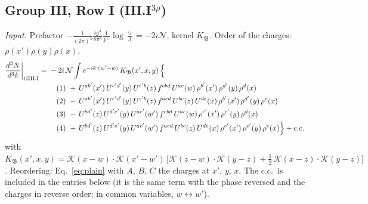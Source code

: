 \documentclass[10pt]{article}
\numberwithin{equation}{section}
\newcommand{\KK}{\mathcal K}
\newcommand{\NN}{\mathcal N}
\begin{document}
\subsection{Group III, Row I \texorpdfstring{(III.I$^{3\rho}$)}{}}\label{src:3:III.I}
\emph{Input.} Prefactor $-\frac{1}{(2\pi)^3}\frac{ig^4}{8\pi^5}\frac1{k^+}\log\frac\vee\Lambda=-2i\NN$, kernel $K_{\mathfrak B}$. Order of the charges: $\rho(x')\rho(y)\rho(x)$.
\begin{align}
\frac{d^3N}{d^3k}\bigg|_{\rm GIII.I}={}&-2i\,\NN\int e^{-ik\cdot(w'-w)}\,K_{\mathfrak B}(x',x,y)\,\Big\{\notag\\
&\quad (1)\ +\,U^{ab'}(x')\,U^{c'd'}(y)\,U^{c'b}(z)\,f^{cbd}\,U^{ac}(w)\,\rho^{b'}(x')\,\rho^{d'}(y)\,\rho^{d}(x)\notag\\
&\quad (2)\ -\,U^{ab'}(x')\,U^{c'd'}(y)\,U^{c'b}(z)\,f^{acd}\,U^{bc}(z)\,U^{de}(x)\,\rho^{b'}(x')\,\rho^{d'}(y)\,\rho^{e}(x)\notag\\
&\quad (3)\ -\,U^{bd'}(z)\,U^{d'e'}(y)\,U^{ac'}(w')\,f^{cbd}\,U^{ac}(w)\,\rho^{c'}(x')\,\rho^{e'}(y)\,\rho^{d}(x)\notag\\
&\quad (4)\ +\,U^{bd'}(z)\,U^{d'e'}(y)\,U^{ac'}(w')\,f^{acd}\,U^{bc}(z)\,U^{de}(x)\,\rho^{c'}(x')\,\rho^{e'}(y)\,\rho^{e}(x)\Big\}+{\rm c.c.}\label{eq:in-GIII.I}
\end{align}
with $K_{\mathfrak B}(x',x,y)=\KK(x-w)\cdot\KK(x'-w')\,\Big[\KK(z-w)\cdot\KK(y-z)+\tfrac12\,\KK(x-z)\cdot\KK(y-z)\Big]$.
Reordering: Eq.~\eqref{eq:plain} with $A$, $B$, $C$ the charges at $x'$, $y$, $x$.
The c.c.\ is included in the entries below (it is the same term with the phase reversed and the charges in reverse order; in common variables, $w\leftrightarrow w'$).
\end{document}
